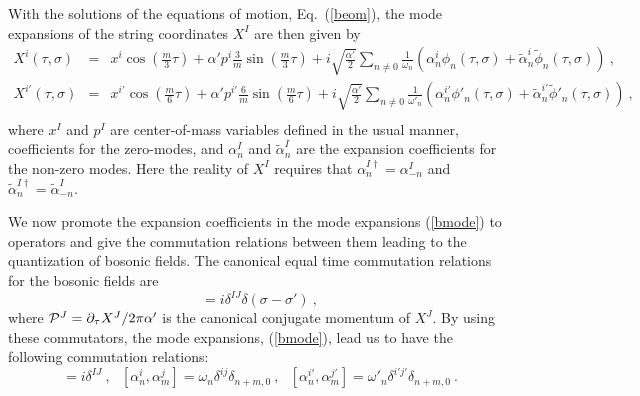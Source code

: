 \documentclass[a4paper,12pt]{article}
\begin{document}
With the solutions of the equations of motion, Eq.~(\ref{beom}), the
mode expansions of the string coordinates $X^I$ are then given by
\begin{eqnarray}
X^i (\tau,\sigma) 
  &=& x^i \cos \left( \frac{m}{3} \tau \right) 
     + \alpha' p^i \frac{3}{m}
             \sin \left( \frac{m}{3} \tau \right) 
   + i \sqrt{ \frac{\alpha'}{2} } \sum_{n \neq 0}
         \frac{1}{\omega_n} 
      ( \alpha^i_n \phi_n (\tau, \sigma )
    + \tilde{\alpha}^i_n \tilde{\phi}_n (\tau, \sigma) ) ~,
                                   \nonumber \\
X^{i'} (\tau,\sigma) 
  &=& x^{i'} \cos \left( \frac{m}{6} \tau \right)
     + \alpha' p^{i'} \frac{6}{m}
              \sin \left( \frac{m}{6} \tau \right) 
   + i \sqrt{ \frac{\alpha'}{2} } \sum_{n \neq 0}
         \frac{1}{\omega'_n} 
      ( \alpha^{i'}_n \phi'_n (\tau, \sigma)
     + \tilde{\alpha}^{i'}_n \tilde{\phi}'_n (\tau, \sigma) )~,
                                   \nonumber \\
\label{bmode}
\end{eqnarray}
where $x^I$ and $p^I$ are center-of-mass variables defined in the
usual manner, coefficients for the zero-modes, and $\alpha^I_n$ and
$\tilde{\alpha}^I_n$ are the expansion coefficients for the non-zero
modes.  Here the reality of $X^I$ requires that $\alpha^{I \dagger}_n
= \alpha^I_{-n}$ and $\tilde{\alpha}^{I \dagger}_n =
\tilde{\alpha}^I_{-n}$.

We now promote the expansion coefficients in the mode expansions
(\ref{bmode}) to operators and give the commutation relations between
them leading to the quantization of bosonic fields.  The canonical
equal time commutation relations for the bosonic fields are
\begin{equation}
[ X^I (\tau, \sigma), {\cal P}^J (\tau, \sigma') ]
= i \delta^{IJ} \delta (\sigma - \sigma') ~,
\label{bcom}
\end{equation}
where ${\cal P}^J = \partial_\tau X^J / 2 \pi \alpha'$ is the
canonical conjugate momentum of $X^J$.  By using these commutators,
the mode expansions, (\ref{bmode}), lead us to have the following
commutation relations:
\begin{equation}
[ x^I, p^J ] = i \delta^{IJ} ~,~~~
[ \alpha^i_n, \alpha^j_m ] = \omega_n \delta^{ij} \delta_{n+m,0}~,~~~
[ \alpha^{i'}_n, \alpha^{j'}_m ] = 
   \omega'_n \delta^{i' j'} \delta_{n+m,0}~.
\label{bmcom}
\end{equation}
\end{document}

